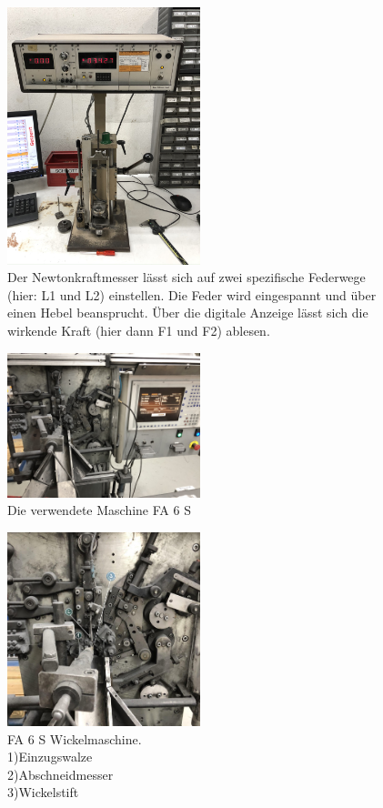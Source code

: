 \begin{figure}[H]
    \centering
    \includegraphics[width=0.5\textwidth]{bilder/fotos/kraftmesser.JPEG}
    \caption{Der Newtonkraftmesser lässt sich auf zwei spezifische Federwege (hier: L1 und L2)
    einstellen. Die Feder wird eingespannt und über einen Hebel beansprucht. Über die digitale Anzeige
    lässt sich die wirkende Kraft (hier dann F1 und F2) ablesen.}
    \label{fig:kraftmesser}
\end{figure}
\begin{figure}[H]
        \centering
        \includegraphics[width=0.5\textwidth]{bilder/fotos/maschine_gesamt.JPEG}
        \caption{Die verwendete Maschine FA 6 S}
\end{figure}
\begin{figure}[H]
        \centering
        \includegraphics[width=0.5\textwidth]{bilder/fotos/maschine_nah_beschriftet.jpg}
        \caption{FA 6 S Wickelmaschine.\\
        1)Einzugswalze\\
        2)Abschneidmesser\\
        3)Wickelstift}
\end{figure}


